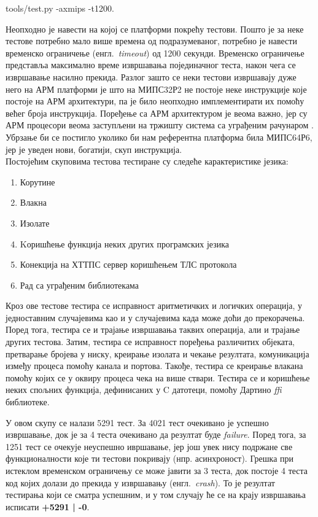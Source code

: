 \documentclass[12pt,oneside]{memoir}
\begin{document}
tools/test.py -axmips -t1200.

Неопходно је навести на којој се платформи покрећу тестови. Пошто је за неке тестове потребно мало више времена од подразумеваног, потребно је навести временско ограничење (енгл.~\textit{timeout}) од 1200 секунди. Временско ограничење представља максимално време извршавања појединачног теста, након чега се извршавање насилно прекида. Разлог зашто се неки тестови извршавају дуже него на АРМ платформи је што на МИПС32Р2 не постоје неке инструкције које постоје на АРМ архитектури, па је било неопходно имплементирати их помоћу већег броја инструкција. Поређење са АРМ архитектуром је веома важно, јер су АРМ процесори веома заступљени на тржишту система са уграђеним рачунаром \cite{arm}. Убрзање би се постигло уколико би нам референтна платформа била МИПС64Р6, јер је уведен нови, богатији, скуп инструкција.\\

Постојећим скуповима тестова тестиране су следеће карактеристике језика:
\begin{enumerate}
\item Корутине
\item Влакна
\item Изолате
\item Kоришћење функција неких других програмских језика
\item Конекција на ХТТПС сервер коришћењем ТЛС протокола
\item Рад са уграђеним библиотекама
\end{enumerate}

Кроз ове тестове тестира се исправност аритметичких и логичких операција, у једноставним случајевима као и у случајевима када може доћи до прекорачења. Поред тога, тестира се и трајање извршавања таквих операција, али и трајање других тестова. Затим, тестира се исправност поређења различитих објеката, претварање бројева у ниску, креирање изолата и чекање резултата, комуникација између процеса помоћу канала и портова. Такође, тестира се креирање влакана помоћу којих се у оквиру процеса чека на више ствари. Тестира се и коришћење неких спољних функција, дефинисаних у C датотеци, помоћу Дартино \textit{ffi} библиотеке. 

У овом скупу се налази 5291 тест. За 4021 тест очекивано је успешно извршавање, док је за 4 теста очекивано да резултат буде \textit{failure}. Поред тога, за 1251 тест се очекује неуспешно ивршавање, јер још увек нису подржане све функционалности које ти тестови покривају (нпр. асинхроност). Грешка при истеклом временском ограничењу се може јавити за 3 теста, док постоје 4 теста код којих долази до прекида у извршавању (енгл.~\textit{crash}). То је резултат тестирања који се сматра успешним, и у том случају ће се на крају извршавања исписати \textbf{+5291 | -0}.
\end{document}
